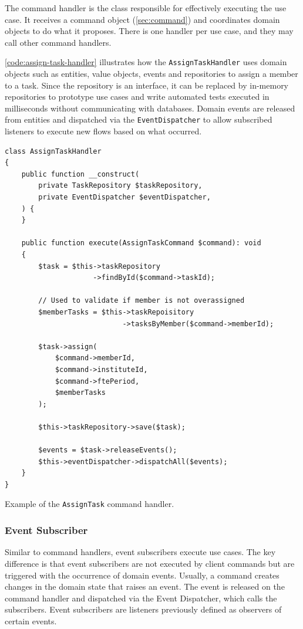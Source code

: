 The command handler is the class responsible for effectively executing the use case. It receives a command object (\autoref{sec:command}) and coordinates domain objects to do what it proposes. There is one handler per use case, and they may call other command handlers.

\autoref{code:assign-task-handler} illustrates how the \texttt{AssignTaskHandler} uses domain objects such as entities, value objects, events and repositories to assign a member to a task. Since the repository is an interface, it can be replaced by in-memory repositories to prototype use cases and write automated tests executed in milliseconds without communicating with databases. Domain events are released from entities and dispatched via the \texttt{EventDispatcher} to allow subscribed listeners to execute new flows based on what occurred.

\begin{listing}[htbp]
\begin{verbatim}
class AssignTaskHandler
{
	public function __construct(
		private TaskRepository $taskRepository,
		private EventDispatcher $eventDispatcher,
	) {
	}

	public function execute(AssignTaskCommand $command): void
	{
		$task = $this->taskRepository
                     ->findById($command->taskId);

		// Used to validate if member is not overassigned
		$memberTasks = $this->taskRepoisitory
                            ->tasksByMember($command->memberId);
		
		$task->assign(
			$command->memberId,
			$command->instituteId,
			$command->ftePeriod,
			$memberTasks
		);

		$this->taskRepository->save($task);

		$events = $task->releaseEvents();
		$this->eventDispatcher->dispatchAll($events);
	}
}
\end{verbatim}
\caption{Example of the \texttt{AssignTask} command handler.}
\label{code:assign-task-handler}
\end{listing}

\subsubsection{Event Subscriber}
\label{sec:event-subscriber}

Similar to command handlers, event subscribers execute use cases. The key difference is that event subscribers are not executed by client commands but are triggered with the occurrence of domain events. Usually, a command creates changes in the domain state that raises an event. The event is released on the command handler and dispatched via the Event Dispatcher, which calls the subscribers. Event subscribers are listeners previously defined as observers of certain events.

